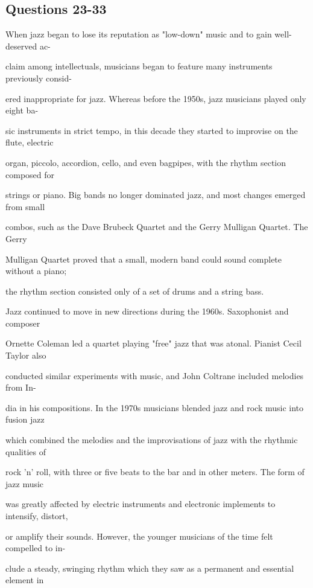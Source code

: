 \documentclass[12pt]{article}
\begin{document}
\subsection*{Questions 23-33}
\begingroup
\small
\sloppy
\setlength{\parskip}{0pt}
\setlength{\parindent}{0pt}
When jazz began to lose its reputation as "low-down" music and to gain well-deserved ac-\par
claim among intellectuals, musicians began to feature many instruments previously consid-\par
ered inappropriate for jazz. Whereas before the 1950s, jazz musicians played only eight ba-\par
sic instruments in strict tempo, in this decade they started to improvise on the flute, electric\par
organ, piccolo, accordion, cello, and even bagpipes, with the rhythm section composed for\par
strings or piano. Big bands no longer dominated jazz, and most changes emerged from small\par
combos, such as the Dave Brubeck Quartet and the Gerry Mulligan Quartet. The Gerry\par
Mulligan Quartet proved that a small, modern band could sound complete without a piano;\par
the rhythm section consisted only of a set of drums and a string bass.\par
Jazz continued to move in new directions during the 1960s. Saxophonist and composer\par
Ornette Coleman led a quartet playing "free" jazz that was atonal. Pianist Cecil Taylor also\par
conducted similar experiments with music, and John Coltrane included melodies from In-\par
dia in his compositions. In the 1970s musicians blended jazz and rock music into fusion jazz\par
which combined the melodies and the improvisations of jazz with the rhythmic qualities of\par
rock 'n' roll, with three or five beats to the bar and in other meters. The form of jazz music\par
was greatly affected by electric instruments and electronic implements to intensify, distort,\par
or amplify their sounds. However, the younger musicians of the time felt compelled to in-\par
clude a steady, swinging rhythm which they saw as a permanent and essential element in\par
\end{document}

